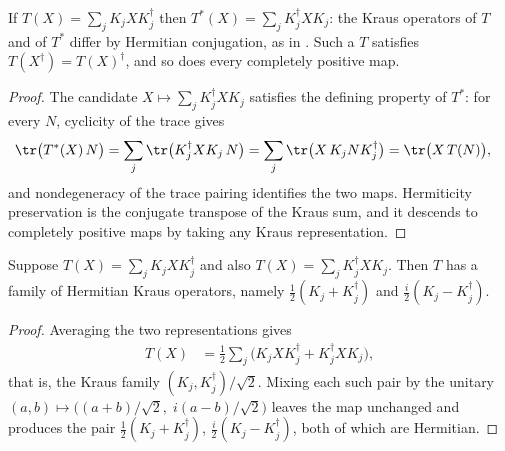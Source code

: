 \begin{lemma}
    \label{lem:trace_adjoint_of_kraus}
    \leanok
    If $T(X)=\sum_j K_j X K_j^\dagger$ then $T^*(X)=\sum_j K_j^\dagger X K_j$: the
    Kraus operators of $T$ and of $T^*$ differ by Hermitian conjugation, as in
    \cite[Section~2.2, after Proposition~2.4]{Wolf2012Quantum}. Such a $T$
    satisfies $T(X^\dagger)=T(X)^\dagger$, and so does every completely positive
    map.
\end{lemma}

\begin{proof}\leanok
    The candidate $X\mapsto\sum_jK_j^\dagger XK_j$ satisfies the defining
    property of $T^*$: for every $N$, cyclicity of the trace gives
    \begin{align}
        \tr\bigl(T^*(X)\,N\bigr)
        &= \sum_j\tr\bigl(K_j^\dagger XK_j\,N\bigr)
         = \sum_j\tr\bigl(X\,K_jNK_j^\dagger\bigr)
         = \tr\bigl(X\,T(N)\bigr),
    \end{align}
    and nondegeneracy of the trace pairing identifies the two maps. Hermiticity
    preservation is the conjugate transpose of the Kraus sum, and it descends to
    completely positive maps by taking any Kraus representation.
\end{proof}

\begin{lemma}
    \label{lem:hermitian_kraus_of_self_dual}
    \leanok
    Suppose $T(X)=\sum_j K_j X K_j^\dagger$ and also
    $T(X)=\sum_j K_j^\dagger X K_j$. Then $T$ has a family of Hermitian Kraus
    operators, namely $\tfrac12(K_j+K_j^\dagger)$ and
    $\tfrac{i}{2}(K_j-K_j^\dagger)$.
\end{lemma}

\begin{proof}\leanok
    Averaging the two representations gives
    \begin{align}
        T(X)
        &= \frac12\sum_j\bigl(K_jXK_j^\dagger+K_j^\dagger XK_j\bigr),
    \end{align}
    that is, the Kraus family $(K_j,K_j^\dagger)/\sqrt2$. Mixing each such pair
    by the unitary $(a,b)\mapsto\bigl((a+b)/\sqrt2,\;i(a-b)/\sqrt2\bigr)$ leaves
    the map unchanged and produces the pair $\tfrac12(K_j+K_j^\dagger)$,
    $\tfrac{i}{2}(K_j-K_j^\dagger)$, both of which are Hermitian.
\end{proof}

